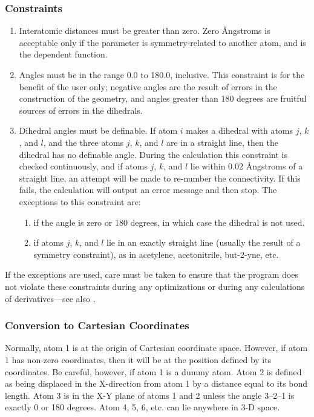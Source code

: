 \subsubsection{Constraints}
\begin{enumerate}
\item  Interatomic distances must be greater than zero.  Zero \AA ngstroms
    is  acceptable  only  if  the  parameter  is symmetry-related to
    another atom, and is the dependent function.

\item Angles must be in the  range  0.0  to  180.0,  inclusive.   This
    constraint  is for the benefit of the user only; negative angles
    are the result of errors in the construction  of  the  geometry,
    and  angles  greater  than  180  degrees are fruitful sources of
    errors in the dihedrals.

\item Dihedral angles must be definable.  If atom $i$ makes a  dihedral with
    atoms $j$, $k$, and $l$, and the three atoms $j$, $k$, and $l$ are in a
    straight line, then the dihedral has no definable angle.  During the
    calculation this constraint is checked continuously, and if atoms $j$, $k$,
    and $l$ lie within 0.02 \AA ngstroms of a straight  line, an attempt will
    be made to re-number the connectivity.  If this fails, the calculation will
    output an error message and then stop. The exceptions to this constraint
    are:
\begin{enumerate}
\item if the angle is zero or 180 degrees, in which case the dihedral
is not used.

\item if atoms $j$, $k$, and $l$ lie in an  exactly  straight  line
    (usually  the result of a symmetry constraint), as in acetylene,
    acetonitrile, but-2-yne, etc.
\end{enumerate}
\end{enumerate}

If the exceptions are used, care must be taken to  ensure  that  the
program  does  not  violate these constraints during any optimizations or
during any calculations of derivatives---see also .

\subsubsection{Conversion to Cartesian Coordinates}
Normally, atom 1 is at the origin of Cartesian coordinate space.  However, if
atom 1 has non-zero coordinates, then it will be at the position defined by its
coordinates. Be careful, however, if atom 1 is a dummy atom.  Atom 2 is defined
as being displaced in the X-direction from atom 1 by a distance equal  to its
bond length. Atom  3  is  in the  X-Y  plane of atoms 1 and 2 unless the angle
3--2--1 is exactly 0 or  180 degrees.  Atom 4, 5, 6, etc.  can lie anywhere in
3-D space.


